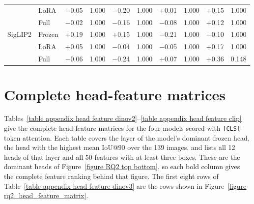 \documentclass[lineno,pdflatex,sn-mathphys-num]{sn-jnl}%
\theoremstyle{thmstyleone}%
\theoremstyle{thmstyletwo}%
\theoremstyle{thmstylethree}%
\begin{document}
\begin{appendices}
\begin{table}[!h]
\begin{tabular}{llcccccccc}
         & LoRA   & $-$0.05 & 1.000 & $-$0.20 & 1.000 & +0.01 & 1.000 & +0.15 & 1.000 \\
         & Full   & $-$0.02 & 1.000 & $-$0.16 & 1.000 & $-$0.08 & 1.000 & +0.12 & 1.000 \\ \midrule
SigLIP2  & Frozen & +0.19 & 1.000 & +0.15 & 1.000 & $-$0.21 & 1.000 & $-$0.10 & 1.000 \\
         & LoRA   & +0.05 & 1.000 & $-$0.04 & 1.000 & $-$0.05 & 1.000 & +0.17 & 1.000 \\
         & Full   & $-$0.06 & 1.000 & $-$0.24 & 1.000 & +0.07 & 1.000 & +0.36 & 0.148 \\
\bottomrule
\end{tabular}
\end{table}

\FloatBarrier

\section{Complete head-feature matrices}\label{appendix head feature}

Tables~\ref{table appendix head feature dinov2}--\ref{table appendix head feature clip} give the complete head-feature matrices for the four models scored with \texttt{[CLS]}-token attention. Each table covers the layer of the model's dominant frozen head, the head with the highest mean IoU@90 over the 139 images, and lists all 12 heads of that layer and all 50 features with at least three boxes. These are the dominant heads of Figure~\ref{figure RQ2 top bottom}, so each bold column gives the complete feature ranking behind that figure. The first eight rows of Table~\ref{table appendix head feature dinov3} are the rows shown in Figure~\ref{figure rq2_head_feature_matrix}.


\end{appendices}
\end{document}
